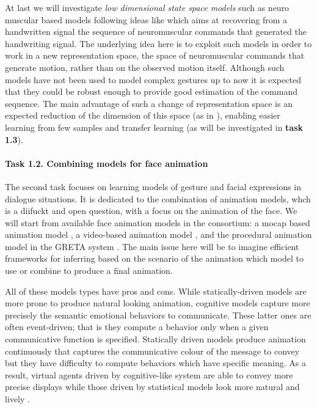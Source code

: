   At last we will investigate {\it low dimensional state space models} such as neuro muscular based models following ideas like \cite{DBLP:conf/icfhr/FischerPOS14} which aims at recovering from a handwritten signal the sequence of neuromuscular commands that generated the handwriting signal. The underlying idea here is to exploit such models in order to work in a new representation space, the space of neuromuscular commands that generate motion, rather than on the observed motion itself. 
  Although such models have not been used to model complex gestures up to now it is expected that they could be robust enough to provide good estimation of the command sequence. The main advantage of such a change of representation space is an expected reduction of the dimension of this space (as in \cite{DBLP:journals/pami/WangFH08}), enabling easier learning from few samples and transfer learning (as will be investigated in \textbf{task 1.3}).
% 


\paragraph{Task 1.2. Combining models for face animation } 

The second task focuses on learning models of gesture and facial expressions in dialogue situations. It is dedicated to the combination of animation models, whch is a diifuckt and open question, with a focus on the animation of the face. We will start from available face animation models in the consortium:  a mocap based animation model \cite{DBLP:conf/icassp/DingRAP13,Ding2014}, a video-based animation model \cite{Barbulescu2014}, and the procedural animation model in the GRETA system  \cite{greta}. The main issue here will be to imagine efficient frameworks for inferring based on the scenario of the animation which model to use or combine to produce a final animation.


All of these models types have pros and cons. While statically-driven models are more prone to produce natural looking animation, cognitive
models capture more precisely the semantic emotional behaviors to communicate. These latter ones are often event-driven; that is they compute a behavior only when a given communicative function is specified. Statically driven models produce animation continuously that captures the communicative colour of the message to convey but they have difficulty to compute behaviors which have specific meaning. As a result, virtual agents driven by cognitive-like system are able to convey more precise displays while those driven by statistical models look more natural and lively \cite{DBLP:conf/iva/LeeM12}.

